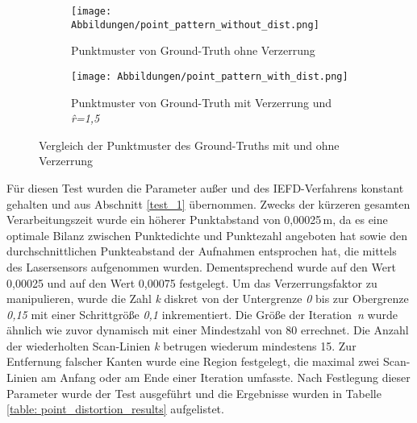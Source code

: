 \begin{figure}[b]
	\centering
	\begin{subfigure}{0.49\textwidth}
		\texttt{[image: Abbildungen/point\_pattern\_without\_dist.png]}
		\centering
		\caption{Punktmuster von Ground-Truth ohne Verzerrung}
		\label{fig: point_pattern_without_dist}
	\end{subfigure}
	\hfill
	\begin{subfigure}{0.49\textwidth}
		\texttt{[image: Abbildungen/point\_pattern\_with\_dist.png]}
		\centering
		\caption{Punktmuster von Ground-Truth mit Verzerrung und \textit{\^{r}=1,5}}
		\label{fig: point_patter_with_dist}
	\end{subfigure}
	\caption{Vergleich der Punktmuster des Ground-Truths mit und ohne Verzerrung}
	\label{fig: point_pattern_comparision}
\end{figure}

Für diesen Test wurden die Parameter außer \distthresha und \distthreshb des IEFD-Verfahrens konstant gehalten und aus Abschnitt \ref{test_1} übernommen. Zwecks der kürzeren gesamten Verarbeitungszeit wurde ein höherer Punktabstand von 0,00025\,\si{\m}, da es eine optimale Bilanz zwischen Punktedichte und Punktezahl angeboten hat sowie den durchschnittlichen Punkteabstand der Aufnahmen entsprochen hat, die mittels des Lasersensors aufgenommen wurden. Dementsprechend wurde \distthresha auf den Wert 0,00025 und \distthreshb auf den Wert 0,00075 festgelegt. Um das Verzerrungsfaktor zu manipulieren, wurde die Zahl \textit{k} diskret von der Untergrenze \textit{0} bis zur Obergrenze \textit{0,15} mit einer Schrittgröße \textit{0,1} inkrementiert. Die Größe der Iteration~\textit{n} wurde ähnlich wie zuvor dynamisch mit einer Mindestzahl von 80 errechnet. Die Anzahl der wiederholten Scan-Linien \textit{k} betrugen wiederum mindestens 15. Zur Entfernung falscher Kanten wurde eine Region festgelegt, die maximal zwei Scan-Linien am Anfang oder am Ende einer Iteration umfasste. Nach Festlegung dieser Parameter wurde der Test ausgeführt und die Ergebnisse wurden in Tabelle \ref{table: point_distortion_results} aufgelistet.

